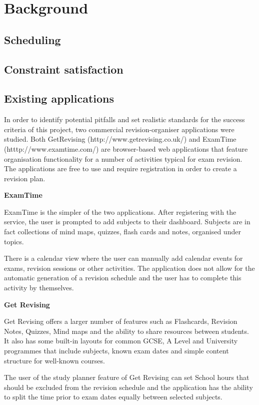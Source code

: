 \documentclass[bsc,frontabs,twoside,singlespacing,parskip]{infthesis}     %
\begin{document}
\chapter{Background}

	

	\section{Scheduling}
	
	\section{Constraint satisfaction}
	
	\section{Existing applications}
	In order to identify potential pitfalls and set realistic standards for the success criteria of this project, two commercial revision-organiser applications were studied. Both GetRevising (http://www.getrevising.co.uk/) and ExamTime (htttp://www.examtime.com/) are browser-based web applications that feature organisation functionality for a number of activities typical for exam revision. The applications are free to use and require registration in order to create a revision plan.
	
	\textbf{ExamTime}
	
	ExamTime is the simpler of the two applications. After registering with the service, the user is prompted to add subjects to their dashboard. Subjects are in fact collections of mind maps, quizzes, flash cards and notes, organised under topics.
	
	There is a calendar view where the user can manually add calendar events for exams, revision sessions or other activities. The application does not allow for the automatic generation of a revision schedule and the user has to complete this activity by themselves.
	
	\textbf{Get Revising}
	
	Get Revising offers a larger number of features such as Flashcards, Revision Notes, Quizzes, Mind maps and the ability to share resources between students. It also has some built-in layouts for common GCSE, A Level and University programmes that include subjects, known exam dates and simple content structure for well-known courses.
	
	The user of the study planner feature of Get Revising can set School hours that should be excluded from the revision schedule and the application has the ability to split the time prior to exam dates equally between selected subjects. 
	
\end{document}
